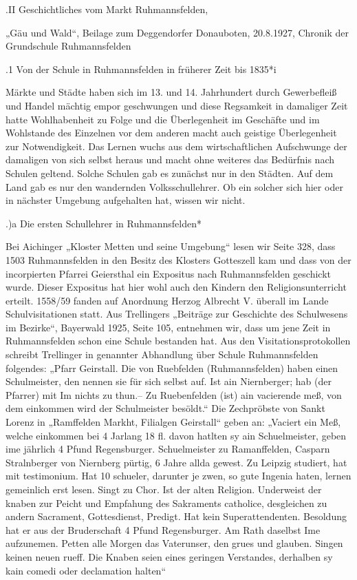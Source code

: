 \documentclass{book}
\begin{document}
.II Geschichtliches vom Markt Ruhmannsfelden,

„Gäu und Wald“, Beilage zum Deggendorfer Donauboten, 20.8.1927, Chronik der
Grundschule Ruhmannsfelden

.1 Von der Schule in Ruhmannsfelden in früherer Zeit bis 1835*i

Märkte und Städte haben sich im 13. und 14. Jahrhundert durch Gewerbefleiß und
Handel mächtig empor geschwungen und diese Regsamkeit in damaliger Zeit hatte
Wohlhabenheit zu Folge und die Überlegenheit im Geschäfte und im Wohlstande des
Einzelnen vor dem anderen macht auch geistige Überlegenheit zur Notwendigkeit.
Das Lernen wuchs aus dem wirtschaftlichen Aufschwunge der damaligen von sich
selbst heraus und macht ohne weiteres das Bedürfnis nach Schulen geltend. Solche
Schulen gab es zunächst nur in den Städten. Auf dem Land gab es nur den
wandernden Volksschullehrer. Ob ein solcher sich hier oder in nächster Umgebung
aufgehalten hat, wissen wir nicht.

.)a Die ersten Schullehrer in Ruhmannsfelden*

Bei Aichinger „Kloster Metten und seine Umgebung“ lesen wir Seite 328, dass 1503
Ruhmannsfelden in den Besitz des Klosters Gotteszell kam und dass von der
incorpierten Pfarrei Geiersthal ein Expositus nach Ruhmannsfelden geschickt
wurde. Dieser Expositus hat hier wohl auch den Kindern den Religionsunterricht
erteilt. 1558/59 fanden auf Anordnung Herzog Albrecht V. überall im Lande
Schulvisitationen statt. Aus Trellingers „Beiträge zur Geschichte des
Schulwesens im Bezirke“, Bayerwald 1925, Seite 105, entnehmen wir, dass um jene
Zeit in Ruhmannsfelden schon eine Schule bestanden hat. Aus den
Visitationsprotokollen schreibt Trellinger in genannter Abhandlung über Schule
Ruhmannsfelden folgendes: „Pfarr Geirstall. Die von Ruebfelden (Ruhmannsfelden)
haben einen Schulmeister, den nennen sie für sich selbst auf. Ist ain
Niernberger; hab (der Pfarrer) mit Im nichts zu thun.--  Zu Ruebenfelden (ist)
ain vacierende meß, von dem einkommen wird der Schulmeister besöldt.“ Die
Zechpröbste von Sankt Lorenz in „Ramffelden Markht, Filialgen Geirstall“ geben
an: „Vaciert ein Meß, welche einkommen bei 4 Jarlang 18 fl. davon hatlten sy ain
Schuelmeister, geben ime jährlich 4 Pfund Regensburger. Schuelmeister zu
Ramanffelden, Casparn Stralnberger von Niernberg pürtig, 6 Jahre allda gewest.
Zu Leipzig studiert, hat mit testimonium. Hat 10 schueler, darunter je zwen, so
gute Ingenia haten, lernen gemeinlich erst lesen. Singt zu Chor. Ist der alten
Religion. Underweist der knaben zur Peicht und Empfahung des Sakraments
catholice, desgleichen zu andern Sacrament, Gottesdienst, Predigt. Hat kein
Superattendenten. Besoldung hat er aus der Bruderschaft 4 Pfund Regensburger. Am
Rath daselbst Ime aufzunemen. Petten alle Morgen das Vaterunser, den grues und
glauben. Singen keinen neuen rueff. Die Knaben seien eines geringen Verstandes,
derhalben sy kain comedi oder declamation halten“
\end{document}
